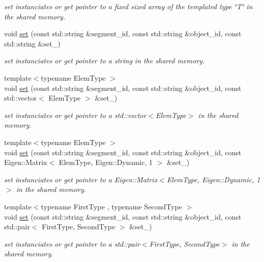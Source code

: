 \begin{DoxyCompactItemize}
\begin{DoxyCompactList}\small\item\em set instanciates or get pointer to a fixed sized array of the templated type \char`\"{}\+T\char`\"{} in the shared memory. \end{DoxyCompactList}\item 
void \hyperlink{namespaceshared__memory_a61a2945c994bcbe84cc8dce96a189edb}{set} (const std\+::string \&segment\+\_\+id, const std\+::string \&object\+\_\+id, const std\+::string \&set\+\_\+)
\begin{DoxyCompactList}\small\item\em set instanciates or get pointer to a string in the shared memory. \end{DoxyCompactList}\item 
{\footnotesize template$<$typename Elem\+Type $>$ }\\void \hyperlink{namespaceshared__memory_ac6521a6731fa97be21779b1d6c7589ee}{set} (const std\+::string \&segment\+\_\+id, const std\+::string \&object\+\_\+id, const std\+::vector$<$ Elem\+Type $>$ \&set\+\_\+)
\begin{DoxyCompactList}\small\item\em set instanciates or get pointer to a std\+::vector$<$\+Elem\+Type$>$ in the shared memory. \end{DoxyCompactList}\item 
{\footnotesize template$<$typename Elem\+Type $>$ }\\void \hyperlink{namespaceshared__memory_ac8364e5cde6c8a2f1abc2a59035f26a6}{set} (const std\+::string \&segment\+\_\+id, const std\+::string \&object\+\_\+id, const Eigen\+::\+Matrix$<$ Elem\+Type, Eigen\+::\+Dynamic, 1 $>$ \&set\+\_\+)
\begin{DoxyCompactList}\small\item\em set instanciates or get pointer to a Eigen\+::\+Matrix$<$\+Elem\+Type, Eigen\+::\+Dynamic, 1$>$ in the shared memory. \end{DoxyCompactList}\item 
{\footnotesize template$<$typename First\+Type , typename Second\+Type $>$ }\\void \hyperlink{namespaceshared__memory_a657bb799483a19a96f61706b50aca1e7}{set} (const std\+::string \&segment\+\_\+id, const std\+::string \&object\+\_\+id, const std\+::pair$<$ First\+Type, Second\+Type $>$ \&set\+\_\+)
\begin{DoxyCompactList}\small\item\em set instanciates or get pointer to a std\+::pair$<$\+First\+Type, Second\+Type$>$ in the shared memory. \end{DoxyCompactList}\item 

\end{DoxyCompactItemize}
